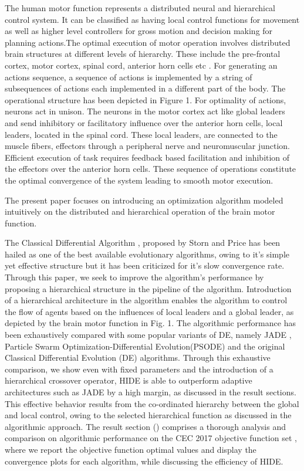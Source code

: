 The human motor function represents a distributed neural and hierarchical control system. It can be classified as having local control functions for movement as well as higher level controllers for gross motion and decision making for planning actions.The optimal execution of motor operation involves distributed brain structures at different levels of hierarchy. These include the pre-frontal cortex, motor cortex, spinal cord, anterior horn cells etc \cite{Shaw1982119}. For generating an actions sequence, a sequence of actions is implemented by a string of subsequences of actions each implemented in a different part of the body. The operational structure has been depicted in Figure 1\cite{passino2005biomimicry}.
For optimality of actions, neurons act in unison. The neurons in the motor cortex act like global leaders and send inhibitory or facilitatory influence over the anterior horn cells, local leaders, located in the spinal cord\cite{Shaw1982119}. These local leaders, are connected to the muscle fibers, effectors through a peripheral nerve and neuromuscular junction.
Efficient execution of task requires feedback based facilitation and inhibition of the effectors over the anterior horn cells. These sequence of operations constitute the optimal convergence of the system leading to smooth motor execution.


The present paper focuses on introducing an optimization algorithm modeled intuitively on the distributed and hierarchical operation of the brain motor function.     

The Classical Differential Algorithm \cite{storn1995differential}, proposed by Storn and Price has been hailed as one of the best available evolutionary algorithms, owing to it's simple yet effective structure but it has been criticized for it's slow convergence rate. Through this paper, we seek to improve the algorithm's performance by proposing a hierarchical structure in the pipeline of the algorithm. Introduction of a hierarchical architecture in the algorithm enables the algorithm to control the flow of agents based on the influences of local leaders and a global leader, as depicted by the brain motor function in Fig. 1. The algorithmic performance has been exhaustively compared with some popular variants of DE, namely JADE \cite{zhang2009jade}, Particle Swarm Optimization-Differential Evolution(PSODE) and the original Classical Differential Evolution (DE) algorithms. Through this exhaustive comparison, we show even with fixed parameters and the introduction of a hierarchical crossover operator, HIDE is able to outperform adaptive architectures such as JADE by a high margin, as discussed in the result sections. This effective behavior results from the co-ordinated hierarchy between the global and local control, owing to the selected hierarchical function as discussed in the algorithmic approach. The result section () comprises a thorough analysis and comparison on algorithmic performance on the CEC 2017 objective function set \cite{cec2017benchmark}, where we report the objective function optimal values and display the convergence plots for each algorithm, while discussing the efficiency of HIDE.



